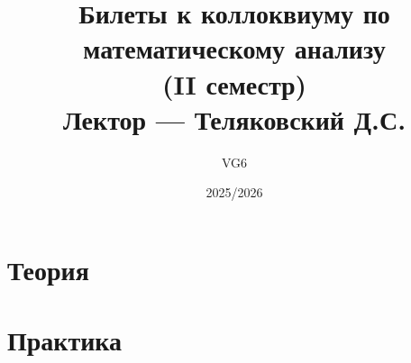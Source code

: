 \documentclass[12pt, a4paper]{article}
\title{Билеты к коллоквиуму по математическому анализу\\(II семестр) \\Лектор --- Теляковский Д.С.}
\author{VG6}
\date{2025/2026}
\begin{document}
\maketitle
\tableofcontents
\newpage


\section{Теория}












\section{Практика}










\end{document}
